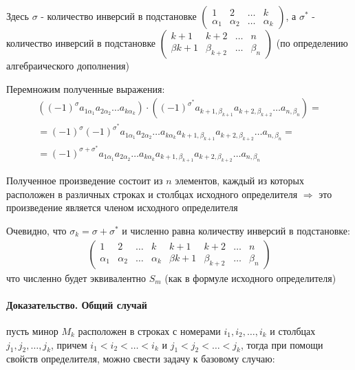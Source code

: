 \documentclass[class=article,a4paper,12pt,crop=false]{standalone}
\begin{document}
Здесь $\sigma$ - количество инверсий в подстановке $\begin{pmatrix}
  1 & 2 & \dots & k\\
  \alpha_1 & \alpha_2 & \dots & \alpha_k
\end{pmatrix}$, а $\sigma^{*}$ - количество инверсий в подстановке $\begin{pmatrix}
  k + 1 & k + 2 & \dots & n\\
  \beta{k + 1} & \beta_{k + 2} & \dots & \beta_{n}
\end{pmatrix}$ (по определению алгебраического дополнения)

Перемножим полученные выражения:
\begin{multline}
  ((-1)^{\sigma}a_{1\alpha_1}a_{2\alpha_2}\dots a_{k\alpha_k}) \cdot ((-1)^{\sigma^{*}}a_{k+1,\beta_{k+1}}a_{k+2,\beta_{k+2}}\dots a_{n,\beta_{n}}) = \\
  = (-1)^{\sigma}(-1)^{\sigma^{*}}a_{1\alpha_1}a_{2\alpha_2}\dots a_{k\alpha_k}a_{k+1,\beta_{k+1}}a_{k+2,\beta_{k+2}}\dots a_{n,\beta_{n}} = \\
  = (-1)^{\sigma + \sigma^{*}}a_{1\alpha_1}a_{2\alpha_2}\dots a_{k\alpha_k}a_{k+1,\beta_{k+1}}a_{k+2,\beta_{k+2}}\dots a_{n,\beta_{n}} 
\end{multline}

Полученное произведение состоит из $n$ элементов, каждый из которых расположен в различных строках и столбцах
исходного определителя $\Rightarrow$ это произведение является членом исходного определителя

Очевидно, что $\sigma_k = \sigma + \sigma^{*}$ и численно равна количеству инверсий в подстановке:
\begin{eqnarray}
  \begin{pmatrix}
    1 & 2 & \dots & k & k + 1 & k + 2 & \dots & n\\
    \alpha_1 & \alpha_2 & \dots & \alpha_k & \beta{k + 1} & \beta_{k + 2} & \dots & \beta_{n}
  \end{pmatrix}
\end{eqnarray}
что численно будет эквивалентно $S_m$ (как в формуле исходного определителя)

\paragraph{Доказательство. Общий случай} пусть минор $M_k$ расположен в строках с номерами
$i_1, i_2, \dots, i_k$ и столбцах $j_1, j_2, \dots, j_k$, причем $i_1 < i_2 < \dots < i_k$ и
$j_1 < j_2 < \dots < j_k$, тогда при помощи свойств определителя, можно свести задачу к базовому случаю:
\end{document}
